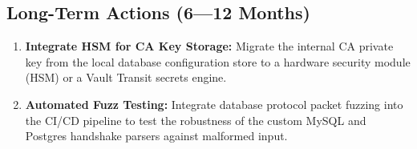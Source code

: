 \subsection{Long-Term Actions (6---12 Months)}
\begin{enumerate}[leftmargin=*]
    \item \textbf{Integrate HSM for CA Key Storage:} Migrate the internal CA private key from the local database configuration store to a hardware security module (HSM) or a Vault Transit secrets engine.
    \item \textbf{Automated Fuzz Testing:} Integrate database protocol packet fuzzing into the CI/CD pipeline to test the robustness of the custom MySQL and Postgres handshake parsers against malformed input.
\end{enumerate}
